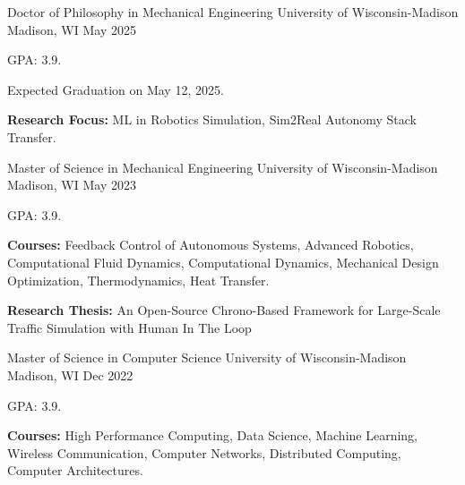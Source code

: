 

\begin{cventries}

  \cventry
    {Doctor of Philosophy in Mechanical Engineering} %
    {University of Wisconsin-Madison} %
    {Madison, WI} %
    {May 2025} %
    {   
    	\begin{cvitems} %
    		\item {GPA: 3.9.}
    		\item {Expected Graduation on May 12, 2025.}
    		\item {\textbf{Research Focus:} ML in Robotics Simulation, Sim2Real Autonomy Stack Transfer.\\
    		}
    	\end{cvitems} 		
    }

    
  \cventry
    {Master of Science in Mechanical Engineering} %
    {University of Wisconsin-Madison} %
    {Madison, WI} %
    {May 2023} %
    {
        \begin{cvitems} %
    		\item {GPA: 3.9.}
    		\item {\textbf{Courses:} Feedback Control of Autonomous Systems, Advanced Robotics, Computational Fluid Dynamics, Computational Dynamics, Mechanical Design Optimization, Thermodynamics, Heat Transfer.}
    		\item {\textbf{Research Thesis:} An Open-Source Chrono-Based Framework for Large-Scale Traffic Simulation with Human In The Loop \\
    		}
    	\end{cvitems}
    }
    
  \cventry
	{Master of Science in Computer Science} %
	{University of Wisconsin-Madison} %
	{Madison, WI} %
	{Dec 2022} %
	{
	  \begin{cvitems} %
		\item {GPA: 3.9.}
		\item {\textbf{Courses:} High Performance Computing, Data Science, Machine Learning, Wireless Communication, Computer Networks, Distributed Computing, Computer Architectures.}
	  \end{cvitems}
	}


\end{cventries}
